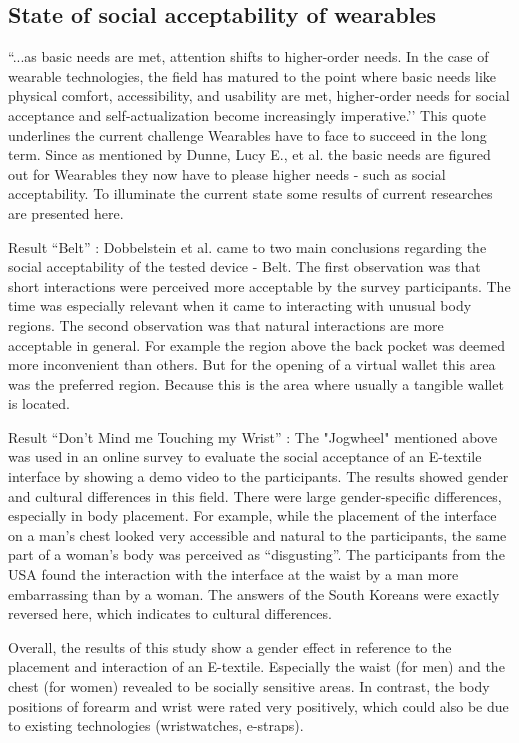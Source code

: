 \documentclass{sigchi}
\begin{document}
\subsection{State of social acceptability of wearables}
``...as basic needs are met, attention shifts to higher-order needs. In the case of wearable technologies, the field has matured to the point where basic needs like physical comfort, accessibility, and usability are met, higher-order needs for social acceptance and self-actualization become increasingly imperative.’’ \cite[p. 4162]{social-comfort} %
This quote underlines the current challenge Wearables have to face to succeed in the long term. Since as mentioned by Dunne, Lucy E., et al. the basic needs are figured out for Wearables they now have to please higher needs - such as social acceptability. To illuminate the current state some results of current researches are presented here.


Result “Belt” \cite{belt} : Dobbelstein et al. came to two main conclusions regarding the social acceptability of the tested device - Belt. The first observation was that short interactions were perceived more acceptable by the survey participants. The time was especially relevant when it came to interacting with unusual body regions. The second observation was that natural interactions are more acceptable in general. For example the region above the back pocket was deemed more inconvenient than others. But for the opening of a virtual wallet this area was the preferred region. Because this is the area where usually a tangible wallet is located.

Result “Don’t Mind me Touching my Wrist” \cite{touch-wrist}: The "Jogwheel" \cite{touch-wrist} mentioned above was used in an online survey to evaluate the social acceptance of an E-textile interface by showing a demo video to the participants. The results showed gender and cultural differences in this field. There were large gender-specific differences, especially in body placement. For example, while the placement of the interface on a man's chest looked very accessible and natural to the participants, the same part of a woman's body was perceived as “disgusting”. \cite{touch-wrist} The participants from the USA found the interaction with the interface at the waist by a man more embarrassing than by a woman. The answers of the South Koreans were exactly reversed here, which indicates to cultural differences. \cite{touch-wrist}

Overall, the results of this study show a gender effect in reference to the placement and interaction of an E-textile. Especially the waist (for men) and the chest (for women) revealed to be socially sensitive areas. In contrast, the body positions of forearm and wrist were rated very positively, which could also be due to existing technologies (wristwatches, e-straps).
\end{document}
